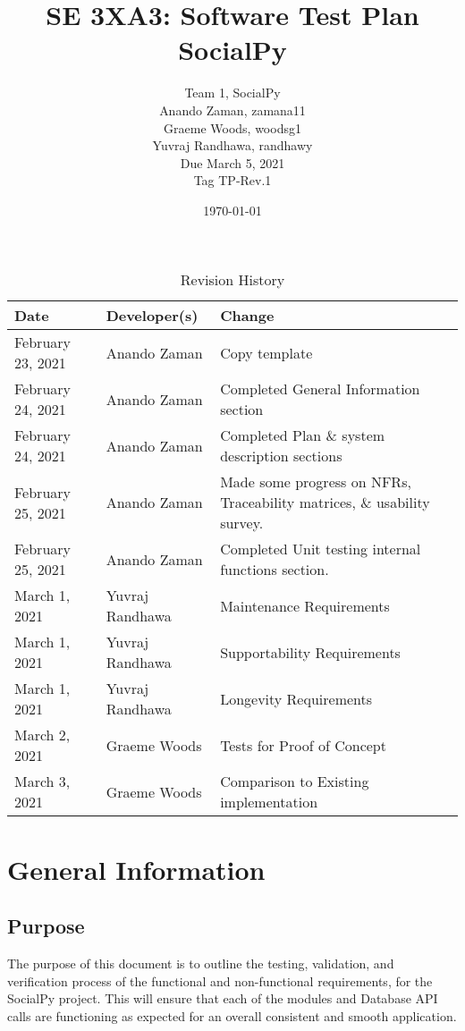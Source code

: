 \documentclass[12pt, titlepage]{article}
\title{SE 3XA3: Software Test Plan\\SocialPy}
\author{
	Team 1, SocialPy
		\\ Anando Zaman, zamana11
        \\ Graeme Woods, woodsg1
        \\ Yuvraj Randhawa, randhawy
        \\ Due March 5, 2021
        \\ Tag TP-Rev.1
}
\date{\today}
\begin{document}
\maketitle

\tableofcontents
\listoftables
\listoffigures

\begin{table}[!hbp]
    \caption{Revision History} \label{RevisionHistory}
    \begin{tabularx}{\textwidth}{llX}
        \toprule
            \textbf{Date} & \textbf{Developer(s)} & \textbf{Change}\\
        \midrule
            February 23, 2021 & Anando Zaman & Copy template\\
            February 24, 2021 & Anando Zaman & Completed General Information section\\
            February 24, 2021 & Anando Zaman & Completed Plan \& system description sections\\
            February 25, 2021 & Anando Zaman & Made some progress on NFRs, Traceability matrices, \& usability survey.\\
            February 25, 2021 & Anando Zaman & Completed Unit testing internal functions section.\\
            March 1, 2021 & Yuvraj Randhawa & Maintenance Requirements\\
            March 1, 2021 & Yuvraj Randhawa & Supportability Requirements\\
            March 1, 2021 & Yuvraj Randhawa & Longevity Requirements\\
            March 2, 2021 & Graeme Woods & Tests for Proof of Concept\\
            March 3, 2021 & Graeme Woods & Comparison to Existing implementation\\
        \bottomrule
    \end{tabularx}
\end{table}

\newpage


\section{General Information}

\subsection{Purpose}
The purpose of this document is to outline the testing, validation, and verification process of
the functional and non-functional requirements, for the SocialPy project. This will ensure that each of the modules and Database API calls are functioning as expected for an overall consistent and smooth application.
\end{document}
